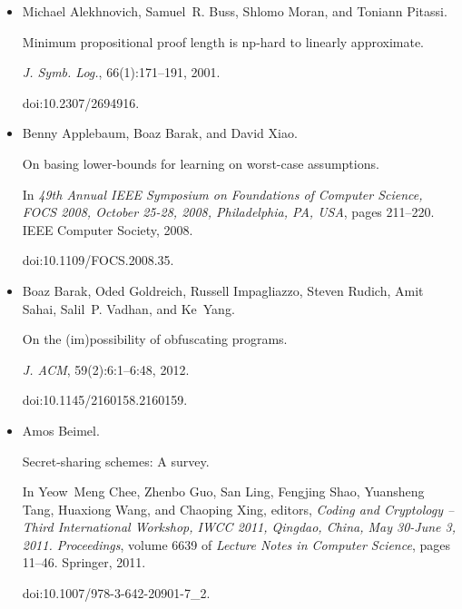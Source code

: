 \documentclass[10pt,a4paper]{article}
\begin{document}
\begin{itemize}


\item[] 
[1]

Michael Alekhnovich, Samuel R. Buss, Shlomo Moran, and Toniann Pitassi.


Minimum propositional proof length is np-hard to linearly
approximate.


\emph{J. Symb. Log.}, 66(1):171–191, 2001.


doi:10.2307/2694916.





\item[] 
[2]

Benny Applebaum, Boaz Barak, and David Xiao.


On basing lower-bounds for learning on worst-case assumptions.


In \emph{49th Annual IEEE Symposium on Foundations of Computer
Science, FOCS 2008, October 25-28, 2008, Philadelphia, PA, USA}, pages
211–220. IEEE Computer Society, 2008.


doi:10.1109/FOCS.2008.35.





\item[] 
[3]

Boaz Barak, Oded Goldreich, Russell Impagliazzo, Steven Rudich, Amit Sahai,
Salil P. Vadhan, and Ke Yang.


On the (im)possibility of obfuscating programs.


\emph{J. ACM}, 59(2):6:1–6:48, 2012.


doi:10.1145/2160158.2160159.





\item[] 
[4]

Amos Beimel.


Secret-sharing schemes: A survey.


In Yeow Meng Chee, Zhenbo Guo, San Ling, Fengjing Shao, Yuansheng
Tang, Huaxiong Wang, and Chaoping Xing, editors, \emph{Coding and Cryptology
– Third International Workshop, IWCC 2011, Qingdao, China, May 30-June 3,
2011. Proceedings}, volume 6639 of \emph{Lecture Notes in Computer Science},
pages 11–46. Springer, 2011.


doi:10.1007/978-3-642-20901-7\_2.






\end{itemize}
\end{document}
